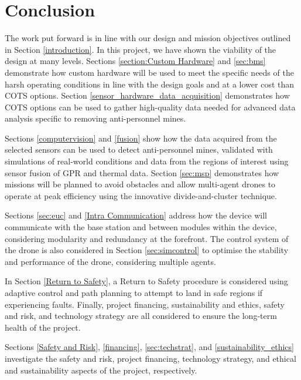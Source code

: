 \newpage
{}

\section{Conclusion} \label{conclusion}

The work put forward is in line with our design and mission objectives outlined in Section \ref{introduction}. In this project, we have shown the viability of the design at many levels. Sections \ref{section:Custom Hardware} and \ref{sec:bms} demonstrate how custom hardware will be used to meet the specific needs of the harsh operating conditions in line with the design goals and at a lower cost than \gls{COTS} options. Section \ref{sensor_hardware_data_acquisition} demonstrates how \gls{COTS} options can be used to gather high-quality data needed for advanced data analysis specific to removing anti-personnel mines.

Sections \ref{computervision} and \ref{fusion} show how the data acquired from the selected sensors can be used to detect anti-personnel mines, validated with simulations of real-world conditions and data from the regions of interest using sensor fusion of \gls{GPR} and thermal data. Section \ref{sec:msp} demonstrates how missions will be planned to avoid obstacles and allow multi-agent drones to operate at peak efficiency using the innovative divide-and-cluster technique. 

Sections \ref{sec:euc} and \ref{Intra Communication} address how the device will communicate with the base station and between modules within the device, considering modularity and redundancy at the forefront. The control system of the drone is also considered in Section \ref{sec:simcontrol} to optimise the stability and performance of the drone, considering multiple agents. 

In Section \ref{Return to Safety}, a Return to Safety procedure is considered using adaptive control and path planning to attempt to land in safe regions if experiencing faults. Finally, project financing, sustainability and ethics, safety and risk, and technology strategy are all considered to ensure the long-term health of the project. 

Sections \ref{Safety and Risk}, \ref{financing}, \ref{sec:techstrat}, and \ref{sustainability_ethics} investigate the safety and risk, project financing, technology strategy, and ethical and sustainability aspects of the project, respectively.


